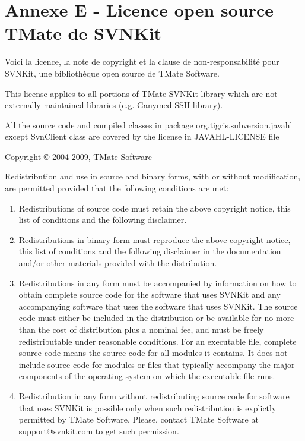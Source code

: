 \chapter*{Annexe E - Licence open source TMate de SVNKit}
\noindent Voici la licence, la note de copyright et la clause de non-responsabilité pour SVNKit,
une bibliothèque open source de TMate Software.

\bigskip
\noindent This license applies to all portions of TMate SVNKit library which 
are not externally-maintained libraries (e.g. Ganymed SSH library).

\bigskip
\noindent All the source code and compiled classes in package org.tigris.subversion.javahl
except SvnClient class are covered by the license in JAVAHL-LICENSE file

\bigskip
\noindent Copyright © 2004-2009, TMate Software

\bigskip
\noindent Redistribution and use in source and binary forms, with or without modification, 
are permitted provided that the following conditions are met:

\begin{enumerate}
  \item      Redistributions of source code must retain the above copyright notice, 
      this list of conditions and the following disclaimer.
      
    \item Redistributions in binary form must reproduce the above copyright notice, 
      this list of conditions and the following disclaimer in the documentation 
      and/or other materials provided with the distribution.
      
    \item Redistributions in any form must be accompanied by information on how to 
      obtain complete source code for the software that uses SVNKit and any 
      accompanying software that uses the software that uses SVNKit. The source 
      code must either be included in the distribution or be available for no 
      more than the cost of distribution plus a nominal fee, and must be freely 
      redistributable under reasonable conditions. For an executable file, complete 
      source code means the source code for all modules it contains. It does not 
      include source code for modules or files that typically accompany the major 
      components of the operating system on which the executable file runs.
      
    \item Redistribution in any form without redistributing source code for software 
      that uses SVNKit is possible only when such redistribution is explictly permitted 
      by TMate Software. Please, contact TMate Software at support@svnkit.com to 
      get such permission.
\end{enumerate}

